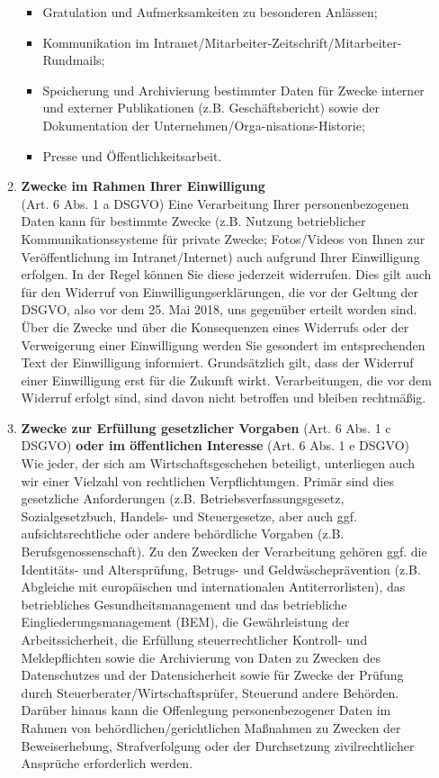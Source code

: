 \documentclass[a4paper, fontsize=11pt]{scrartcl}
\begin{document}
\begin{enumerate}[label=\textbf{\arabic*.},ref=\arabic*]
\begin{enumerate}[label=\textbf{\ref{zwecke}.\arabic*},ref=\ref{zwecke}.\arabic*]
\begin{itemize}
        \item Gratulation und Aufmerksamkeiten zu besonderen Anlässen;
        \item Kommunikation im Intranet/Mitarbeiter-Zeitschrift/Mitarbeiter-Rundmails;
        \item Speicherung und Archivierung bestimmter Daten für Zwecke interner und externer Publikationen (z.B. Geschäftsbericht) sowie der Dokumentation der Unternehmen/Orga-nisations-Historie;
        \item Presse und Öffentlichkeitsarbeit.
      \end{itemize}
    \item \label{zwecke3} \textbf{Zwecke im Rahmen Ihrer Einwilligung} \\ (Art. 6 Abs. 1 a DSGVO) Eine Verarbeitung Ihrer personenbezogenen Daten kann für bestimmte Zwecke (z.B. Nutzung betrieblicher Kommunikationssysteme für private Zwecke; Fotos/Videos von Ihnen zur Veröffentlichung im Intranet/Internet) auch aufgrund Ihrer Einwilligung erfolgen. In der Regel können Sie diese jederzeit widerrufen. Dies gilt auch für den Widerruf von Einwilligungserklärungen, die vor der Geltung der DSGVO, also vor dem 25. Mai 2018, uns gegenüber erteilt worden sind. Über die Zwecke und über die Konsequenzen eines Widerrufs oder der Verweigerung einer Einwilligung werden Sie gesondert im entsprechenden Text der Einwilligung informiert. Grundsätzlich gilt, dass der Widerruf einer Einwilligung erst für die Zukunft wirkt. Verarbeitungen, die vor dem Widerruf erfolgt sind, sind davon nicht betroffen und bleiben rechtmäßig.
    \item \label{zwecke4} \textbf{Zwecke zur Erfüllung gesetzlicher Vorgaben} (Art. 6 Abs. 1 c DSGVO) \textbf{oder im öffentlichen Interesse} (Art. 6 Abs. 1 e DSGVO) \\ Wie jeder, der sich am Wirtschaftsgeschehen beteiligt, unterliegen auch wir einer Vielzahl von rechtlichen Verpflichtungen. Primär sind dies gesetzliche Anforderungen (z.B. Betriebsverfassungsgesetz, Sozialgesetzbuch, Handels- und Steuergesetze, aber auch ggf. aufsichtsrechtliche oder andere behördliche Vorgaben (z.B. Berufsgenossenschaft). Zu den Zwecken der Verarbeitung gehören ggf. die Identitäts- und Altersprüfung, Betrugs- und Geldwäscheprävention (z.B. Abgleiche mit europäischen und internationalen Antiterrorlisten), das betriebliches Gesundheitsmanagement und das betriebliche Eingliederungsmanagement (BEM), die Gewährleistung der Arbeitssicherheit, die Erfüllung steuerrechtlicher Kontroll- und Meldepflichten sowie die Archivierung von Daten zu Zwecken des Datenschutzes und der Datensicherheit sowie für Zwecke der Prüfung durch Steuerberater/Wirtschaftsprüfer, Steuerund andere Behörden. Darüber hinaus kann die Offenlegung personenbezogener Daten im Rahmen von behördlichen/gerichtlichen Maßnahmen zu Zwecken der Beweiserhebung, Strafverfolgung oder der Durchsetzung zivilrechtlicher Ansprüche erforderlich werden.

\end{enumerate}
\end{enumerate}
\end{document}
